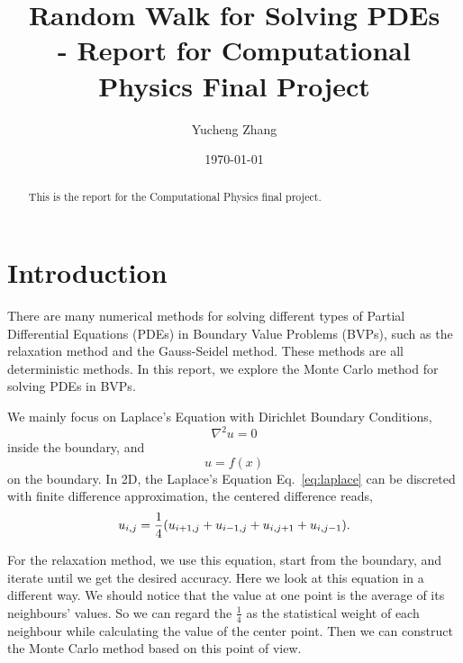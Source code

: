 \documentclass[aps, prl, reprint, groupedaddress]{revtex4-1}
\begin{document}
    
\title{Random Walk for Solving PDEs\\- Report for Computational Physics Final Project}
\author{Yucheng Zhang}
\date{\today}
    
\begin{abstract}
    This is the report for the Computational Physics final project.
\end{abstract}
    
\maketitle

\section{Introduction}

There are many numerical methods for solving different types of Partial Differential Equations (PDEs) in Boundary Value Problems (BVPs), such as the relaxation method and the Gauss-Seidel method. These methods are all deterministic methods. In this report, we explore the Monte Carlo method for solving PDEs in BVPs. 

We mainly focus on Laplace's Equation with Dirichlet Boundary Conditions,
\begin{equation}
    \nabla^2 u = 0
    \label{eq:laplace}
\end{equation} inside the boundary, and
\begin{equation}
    u = f(x)
\end{equation} on the boundary. In 2D, the Laplace's Equation Eq.~\ref{eq:laplace} can be discreted with finite difference approximation, the centered difference reads,
\begin{equation}
    u_{i,j} = \frac{1}{4} \qty(u_{i+1,j}+u_{i-1,j}+u_{i,j+1}+u_{i,j-1}).
\end{equation}


For the relaxation method, we use this equation, start from the boundary, and iterate until we get the desired accuracy. Here we look at this equation in a different way. We should notice that the value at one point is the average of its neighbours' values. So we can regard the $\frac{1}{4}$ as the statistical weight of each neighbour while calculating the value of the center point. Then we can construct the Monte Carlo method based on this point of view.
\end{document}
